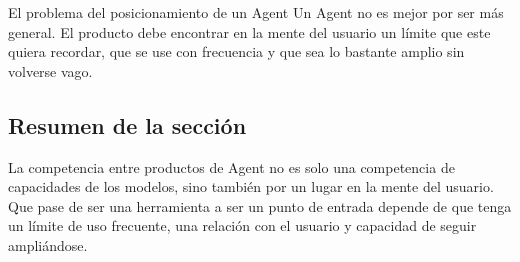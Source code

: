 \begin{importantbox}{El problema del posicionamiento de un Agent}
Un Agent no es mejor por ser más general. El producto debe encontrar en la mente del usuario un límite que este quiera recordar, que se use con frecuencia y que sea lo bastante amplio sin volverse vago.
\end{importantbox}

\subsection{Resumen de la sección}

La competencia entre productos de Agent no es solo una competencia de capacidades de los modelos, sino también por un lugar en la mente del usuario. Que pase de ser una herramienta a ser un punto de entrada depende de que tenga un límite de uso frecuente, una relación con el usuario y capacidad de seguir ampliándose.
